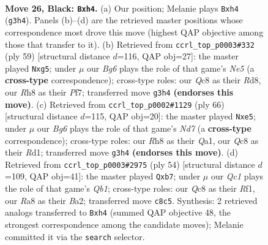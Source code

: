 \documentclass[11pt]{article}
\begin{document}
\clearpage

\begin{figure}[p]\centering
\begin{subfigure}{0.46\textwidth}\centering
\resizebox{\linewidth}{!}{%
\newchessgame
\chessboard[
  setfen={r1qk3r/p4pp1/5n1p/5P1P/B1Q4R/6b1/4K1p1/R1B3N1 b - - 2 26},
  showmover=false,
  pgfstyle=straightmove, color=movearrow, markmove={g3-h4}
]}
\caption{}
\end{subfigure}\hfill
\begin{subfigure}{0.46\textwidth}\centering
\resizebox{\linewidth}{!}{%
\newchessgame
\chessboard[
  setfen={3rr1k1/p4pp1/2p5/2P1pPQ1/1p2n3/6RP/4K3/3R1B2 b - - 2 30},
  showmover=false,
  pgfstyle=straightmove, color=movearrow, markmove={e4-g5}
]}
\caption{}
\end{subfigure}
\\[4pt]
\begin{subfigure}{0.46\textwidth}\centering
\resizebox{\linewidth}{!}{%
\newchessgame
\chessboard[
  setfen={4k3/1ppNq1pp/8/pP2r2b/P1P1p3/8/5PPP/Q2R2K1 w - - 10 34},
  showmover=false,
  pgfstyle=straightmove, color=movearrow, markmove={d7-e5}
]}
\caption{}
\end{subfigure}\hfill
\begin{subfigure}{0.46\textwidth}\centering
\resizebox{\linewidth}{!}{%
\newchessgame
\chessboard[
  setfen={3rk2r/ppp3pp/2n5/5NP1/5P2/B1bqP3/B7/1Q3RK1 w k - 5 28},
  showmover=false,
  pgfstyle=straightmove, color=movearrow, markmove={b1-b7}
]}
\caption{}
\end{subfigure}
\caption{\textbf{Move 26, Black: \texttt{Bxh4}.} (a) Our position; Melanie plays \texttt{Bxh4} (\texttt{g3h4}). Panels (b)--(d) are the retrieved master positions whose correspondence most drove this move (highest QAP objective among those that transfer to it). (b) Retrieved from \texttt{ccrl\_top\_p0003\#332} (ply 59) [structural distance $d$=116, QAP obj=27]: the master played \texttt{Nxg5}; under $\mu$ our \emph{Bg6} plays the role of that game's \emph{Ne5} (a \textbf{cross-type} correspondence); cross-type roles: our \emph{Q}c8 as their \emph{R}d8, our \emph{R}h8 as their \emph{P}f7; transferred move \texttt{g3h4} \textbf{(endorses this move)}. (c) Retrieved from \texttt{ccrl\_top\_p0002\#1129} (ply 66) [structural distance $d$=115, QAP obj=20]: the master played \texttt{Nxe5}; under $\mu$ our \emph{Bg6} plays the role of that game's \emph{Nd7} (a \textbf{cross-type} correspondence); cross-type roles: our \emph{R}h8 as their \emph{Q}a1, our \emph{Q}c8 as their \emph{R}d1; transferred move \texttt{g3h4} \textbf{(endorses this move)}. (d) Retrieved from \texttt{ccrl\_top\_p0003\#2975} (ply 54) [structural distance $d$=109, QAP obj=41]: the master played \texttt{Qxb7}; under $\mu$ our \emph{Qc1} plays the role of that game's \emph{Qb1}; cross-type roles: our \emph{Q}c8 as their \emph{R}f1, our \emph{R}a8 as their \emph{B}a2; transferred move \texttt{c8c5}. Synthesis: 2 retrieved analogs transferred to \texttt{Bxh4} (summed QAP objective 48, the strongest correspondence among the candidate moves); Melanie committed it via the \texttt{search} selector.}
\label{fig:thought-m51}
\end{figure}
\end{document}
